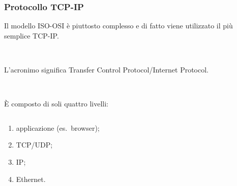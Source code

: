 \documentclass[]{beamer}
\begin{document}
\begin{frame}
\frametitle{Protocollo TCP-IP}
Il modello ISO-OSI è piuttosto complesso e di fatto viene utilizzato il più semplice TCP-IP.\pause

~

L’acronimo significa \alert<2>{Transfer Control Protocol/Internet Protocol}.\pause

~


È composto di soli quattro livelli:
\begin{columns}
\begin{column}{.3\textwidth}
  \begin{enumerate}
    \item \alert<3>{applicazione} (es.~browser);\pause
    \item \alert<4>{TCP/UDP};\pause
    \item \alert<5>{IP};\pause
    \item \alert<6>{Ethernet}.
  \end{enumerate}
\end{column}
\begin{column}{.5\textwidth}
\end{column}
\end{columns}
\end{frame}
\end{document}
